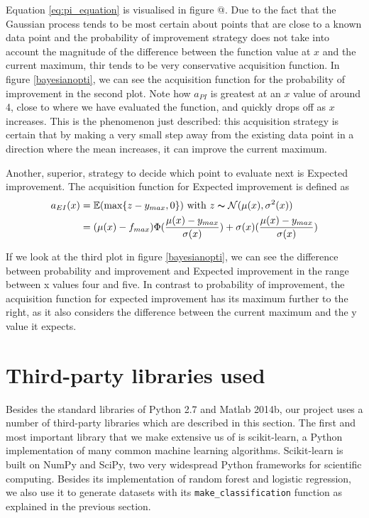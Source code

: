 \documentclass[a4paper,12pt,twoside,openright]{report}
\begin{document}
Equation \ref{eq:pi_equation} is visualised in figure @. Due to the fact that the Gaussian process tends to be most certain about points that are close to a known data point and the probability of improvement strategy does not take into account the magnitude of the difference between the function value at $x$ and the current maximum, thir tends to be very conservative acquisition function. In figure \ref{bayesianopti}, we can see the acquisition function for the probability of improvement in the second plot. Note how $a_{PI}$ is greatest at an $x$ value of around 4, close to where we have evaluated the function, and quickly drops off as $x$ increases. This is the phenomenon just described: this acquisition strategy is certain that by making a very small step away from the existing data point in a direction where the mean increases, it can improve the current maximum.

Another, superior, strategy to decide which point to evaluate next is Expected improvement. The acquisition function for Expected improvement is defined \cite{eipaper} as
\begin{align}
a_{EI}(x) &= \mathbb{E}(\text{max}\{z - y_{max}, 0\}) \text{\ with\ } z \thicksim \mathcal{N}(\mu(x),\sigma^2(x))\\
&= (\mu(x) - f_{max})\Phi(\frac{\mu(x) - y_{max}}{\sigma(x)}) + \sigma(x)(\frac{\mu(x) - y_{max}}{\sigma(x)})
\end{align}


If we look at the third plot in figure \ref{bayesianopti}, we can see the difference between probability and improvement and Expected improvement in the range between x values four and five. In contrast to probability of improvement, the acquisition function for expected improvement has its maximum further to the right, as it also considers the difference between the current maximum and the y value it expects. 






\section{Third-party libraries used}
Besides the standard libraries of Python 2.7 and Matlab 2014b, our project uses a number of third-party libraries which are described in this section. The first and most important library that we make extensive us of is scikit-learn, a Python implementation of many common machine learning algorithms. Scikit-learn is built on NumPy and SciPy, two very widespread Python frameworks for scientific computing. Besides its implementation of random forest and logistic regression, we also use it to generate datasets with its \texttt{make\_classification} function as explained in the previous section.
\end{document}
